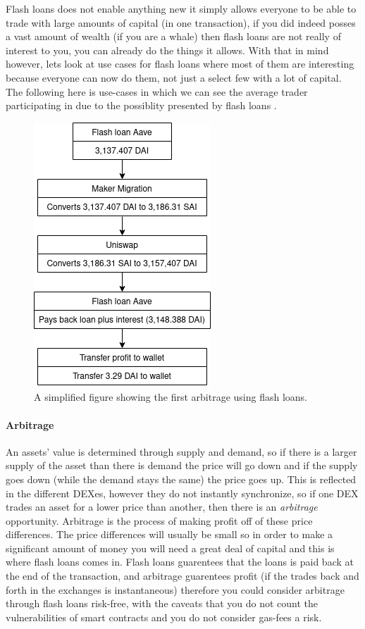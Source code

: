 Flash loans does not enable anything new it simply allows everyone to
be able to trade with large amounts of capital (in one transaction),
if you did indeed posses a vast amount of wealth (if you are a whale)
then flash loans are not really of interest to you, you can already do
the things it allows. With that in mind however, lets look at use
cases for flash loans where most of them are interesting because
everyone can now do them, not just a select few with a lot of
capital. The following here is use-cases in which we can see the
average trader participating in due to the possiblity presented by
flash loans \cite{attack}.

\begin{figure}
  \centering
  \includegraphics[width=.2\textwidth]{assests/Flash-loans-18-jan}
  \caption{A simplified figure showing the first arbitrage using flash loans.}
  \label{fig:firstArb}
\end{figure}
\paragraph{Arbitrage} An assets' value is determined through supply and
demand, so if there is a larger supply of the asset than there is
demand the price will go down and if the supply goes down (while the
demand stays the same) the price goes up. This is reflected in the
different DEXes, however they do not instantly synchronize, so if one
DEX trades an asset for a lower price than another, then there is an
\textit{arbitrage} opportunity. Arbitrage is the process of making
profit off of these price differences. The price differences will
usually be small so in order to make a significant amount of money you
will need a great deal of capital and this is where flash loans comes
in. Flash loans guarentees that the loans is paid back at the end of
the transaction, and arbitrage guarentees profit (if the trades back
and forth in the exchanges is instantaneous) therefore you could
consider arbitrage through flash loans risk-free, with the caveats
that you do not count the vulnerabilities of smart contracts and you
do not consider gas-fees a risk.

